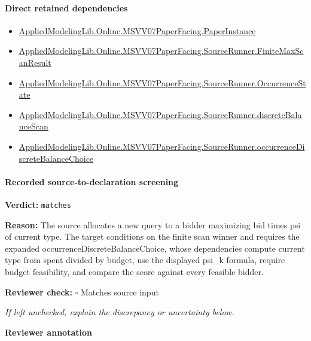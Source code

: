 \documentclass[10pt]{article}
\newcommand{\reviewerbox}{%
  \par\noindent\fbox{\parbox{0.96\linewidth}{\rule{0pt}{0.38in}}}\par
}
\newcommand{\reviewmatch}[1]{%
  \par\noindent\textbf{Reviewer check:} $\square$\; #1\par
  \noindent\emph{If left unchecked, explain the discrepancy or uncertainty below.}\par
}
\begin{document}
\paragraph{Direct retained dependencies}
\begin{itemize}\raggedright
\item \hyperlink{governing-declaration-11907576ec71eeb5}{Applied\allowbreak{}Modeling\allowbreak{}Lib.\allowbreak{}Online.\allowbreak{}MSVV07\allowbreak{}Paper\allowbreak{}Facing.\allowbreak{}Paper\allowbreak{}Instance}
\item \hyperlink{governing-declaration-ebb7db2383e5a26e}{Applied\allowbreak{}Modeling\allowbreak{}Lib.\allowbreak{}Online.\allowbreak{}MSVV07\allowbreak{}Paper\allowbreak{}Facing.\allowbreak{}Source\allowbreak{}Runner.\allowbreak{}Finite\allowbreak{}Max\allowbreak{}Scan\allowbreak{}Result}
\item \hyperlink{governing-declaration-2eff7815f49c1d41}{Applied\allowbreak{}Modeling\allowbreak{}Lib.\allowbreak{}Online.\allowbreak{}MSVV07\allowbreak{}Paper\allowbreak{}Facing.\allowbreak{}Source\allowbreak{}Runner.\allowbreak{}Occurrence\allowbreak{}State}
\item \hyperlink{paper-prerequisite-67f443bf0ff68608}{Applied\allowbreak{}Modeling\allowbreak{}Lib.\allowbreak{}Online.\allowbreak{}MSVV07\allowbreak{}Paper\allowbreak{}Facing.\allowbreak{}Source\allowbreak{}Runner.\allowbreak{}discrete\allowbreak{}Balance\allowbreak{}Scan}
\item \hyperlink{paper-prerequisite-8c5fc45bd0b54d7b}{Applied\allowbreak{}Modeling\allowbreak{}Lib.\allowbreak{}Online.\allowbreak{}MSVV07\allowbreak{}Paper\allowbreak{}Facing.\allowbreak{}Source\allowbreak{}Runner.\allowbreak{}occurrence\allowbreak{}Discrete\allowbreak{}Balance\allowbreak{}Choice}
\end{itemize}
\paragraph{Recorded source-to-declaration screening}
\textbf{Verdict:} \texttt{matches}
\\
{\raggedright
\textbf{Reason:} The source allocates a new query to a bidder maximizing bid times psi of current type.\allowbreak{} The target conditions on the finite scan winner and requires the expanded occurrenceDiscreteBalanceChoice, whose dependencies compute current type from spent divided by budget, use the displayed psi\_\allowbreak{}k formula, require budget feasibility, and compare the score against every feasible bidder.\allowbreak{}
\par}
\reviewmatch{Matches source input}
\noindent\textbf{Reviewer annotation}\par
\reviewerbox
\clearpage
\hypertarget{paper-prerequisite-4ef8324da318759c}{}
\end{document}
